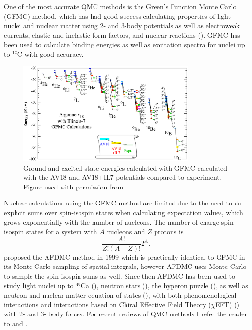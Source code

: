 One of the most accurate QMC methods is the Green's Function Monte Carlo (GFMC) method, which has had good success calculating properties of light nuclei and nuclear matter using 2- and 3-body potentials as well as electroweak currents, elastic and inelastic form factors, and nuclear reactions (\cite{carlson2015}). GFMC has been used to calculate binding energies as well as excitation spectra for nuclei up to $^{12}$C with good accuracy.
\begin{figure}[h!]
   \centering
   \includegraphics[width=0.8\textwidth]{figures/gfmc_energies.png}
   \caption[Ground and Excited State Energies Calculated with GFMC Calculated with the AV18 and AV18+IL7 Potentials Compared to Experiment. Figure Used with Permission from \cite{carlson2015}.]{Ground and excited state energies calculated with GFMC calculated with the AV18 and AV18+IL7 potentials compared to experiment. Figure used with permission from \cite{carlson2015}.}
   \label{fig:energy_gfmc}
\end{figure}
Nuclear calculations using the GFMC method are limited due to the need to do explicit sums over spin-isospin states when calculating expectation values, which grows exponentially with the number of nucleons. The number of charge spin-isospin states for a system with $A$ nucleons and $Z$ protons is
\begin{equation}
   \frac{A!}{Z!(A-Z)!}2^A.
\end{equation}
\cite{schmidt1999} proposed the AFDMC method in 1999 which is practically identical to GFMC in its Monte Carlo sampling of spatial integrals, however AFDMC uses Monte Carlo to sample the spin-isospin sums as well. Since then AFDMC has been used to study light nuclei up to $^{40}$Ca (\cite{gandolfi2007,lonardoni2017}), neutron stars (\cite{gandolfi2014_2,gandolfi2012,tews2018}), the hyperon puzzle (\cite{lonardoni2015,gandolfi2017_2}), as well as neutron and nuclear matter equation of states (\cite{gandolfi2007_2,gandolfi2014,tews2018}), with both phenomenological interactions and interactions based on Chiral Effective Field Theory ($\chi$EFT) (\cite{lonardoni2018_3,lonardoni2018}) with 2- and 3- body forces. For recent reviews of QMC methods I refer the reader to \cite{carlson2015} and \cite{lynn2019}.


